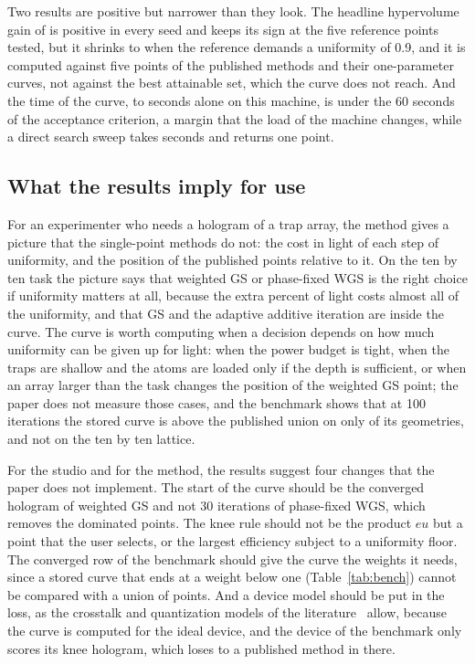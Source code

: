 Two results are positive but narrower than they look. The headline hypervolume gain of \hvFiveDiff{} is positive in every seed and keeps its sign at the five reference points tested, but it shrinks to \hvRefFiveUNineDiff{} when the reference demands a uniformity of 0.9, and it is computed against five points of the published methods and their one-parameter curves, not against the best attainable set, which the curve does not reach. And the time of the curve, \timeAloneMin{} to \timeAloneMax{} seconds alone on this machine, is under the 60 seconds of the acceptance criterion, a margin that the load of the machine changes, while a direct search sweep takes \dsSec{} seconds and returns one point.

\subsection{What the results imply for use}\label{sec:disc-use}

For an experimenter who needs a hologram of a trap array, the method gives a picture that the single-point methods do not: the cost in light of each step of uniformity, and the position of the published points relative to it. On the ten by ten task the picture says that weighted GS or phase-fixed WGS is the right choice if uniformity matters at all, because the extra \eMaxRatioPct{} percent of light costs almost all of the uniformity, and that GS and the adaptive additive iteration are inside the curve. The curve is worth computing when a decision depends on how much uniformity can be given up for light: when the power budget is tight, when the traps are shallow and the atoms
are loaded only if the depth is sufficient, or when an array larger than the task changes the position of the weighted GS point; the paper does not measure those cases, and the benchmark shows that at 100 iterations the stored curve is above the published union on only \benchPassHundred{} of its \benchNHundred{} geometries, and not on the ten by ten lattice.

For the studio and for the method, the results suggest four changes that the paper does not implement. The start of the curve should be the converged hologram of weighted GS and not 30 iterations of phase-fixed WGS, which removes the dominated points. The knee rule should not be the product $eu$ but a point that the user selects, or the largest efficiency subject to a uniformity floor. The converged row of the benchmark should give the curve the weights it needs, since a stored curve that ends at a weight below one (Table~\ref{tab:bench}) cannot be compared with a union of points. And a device model should be put in the loss, as the crosstalk
and quantization models of the literature~\cite{schroff,persson} allow, because the curve is computed for the ideal device, and the device of the benchmark only scores its knee hologram, which loses to a published method in \spreadDevLossList{} there.
